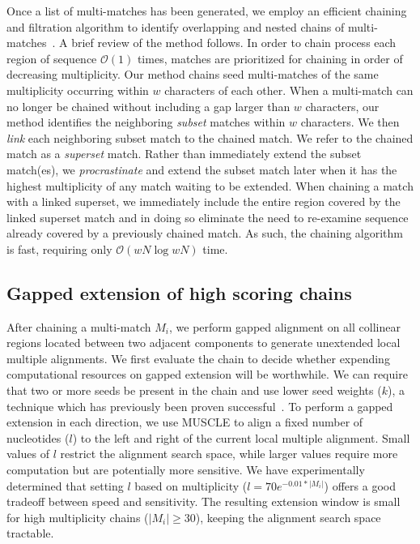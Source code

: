 \documentclass{ws-procs975x65}
\begin{document}
Once a list of multi-matches has been generated, we employ an efficient chaining and filtration algorithm to identify overlapping and nested chains of multi-matches~\cite{ref-procrast}. A brief review of the method follows.
In order to chain process each region of sequence $\mathcal{O}(1)$ times, matches are prioritized for chaining in order of decreasing multiplicity.  Our method chains seed multi-matches of the same multiplicity occurring within $w$
characters of each other.
When a multi-match can no
longer be chained without including a gap larger than $w$
characters, our method identifies the neighboring \textit{subset}
matches within $w$ characters. We then \textit{link} each
neighboring subset match to the chained match. We refer to the
chained match as a \textit{superset} match. Rather than immediately
extend the subset match(es), we \textit{procrastinate} and extend
the subset match later when it has the highest multiplicity of any
match waiting to be extended. When chaining a match with a linked
superset, we immediately include the entire region covered by the linked superset
match and in doing so eliminate the need to re-examine sequence already covered by
a previously chained match.  As such, the chaining algorithm is fast, requiring only $\mathcal{O}(wN \log wN)$ time.

\subsection{Gapped extension of high scoring chains}

After chaining a multi-match $M_i$, we perform gapped alignment on all collinear regions located between two adjacent components to generate unextended local multiple alignments. We first evaluate the chain to decide whether expending computational resources on gapped extension will be worthwhile. We can require that two or more seeds be present in the chain and use lower seed weights ($k$), a technique which has previously been proven successful~\cite{ref-blastz,ref-gappedblast,ref-blat}.  To perform a gapped extension in each direction, we use MUSCLE to align a fixed number of nucleotides ($l$) to the left and right of the current local multiple alignment.
Small values of $l$ restrict the alignment search space, while larger values require more computation but are potentially more sensitive.  We have experimentally determined that setting $l$ based on multiplicity ($l = 70e^{-0.01*|M_{i}|}$) offers a good tradeoff between speed and sensitivity.  The resulting extension window is small for high multiplicity chains ($|M_{i}|\geq 30$), keeping the alignment search space tractable.
\end{document}
